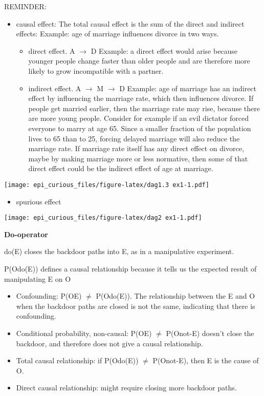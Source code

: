 \documentclass[
]{article}
\providecommand{\tightlist}{%
  \setlength{\itemsep}{0pt}\setlength{\parskip}{0pt}}
\begin{document}
REMINDER:

\begin{itemize}
\item
  causal effect: The total causal effect is the sum of the direct and
  indirect effects: Example: age of marriage influences divorce in two
  ways.

  \begin{itemize}
  \item
    direct effect. A \(\to\) D Example: a direct effect would arise
    because younger people change faster than older people and are
    therefore more likely to grow incompatible with a partner.
  \item
    indirect effect. A \(\to\) M \(\to\) D Example: age of marriage has
    an indirect effect by influencing the marriage rate, which then
    influences divorce. If people get married earlier, then the marriage
    rate may rise, because there are more young people. Consider for
    example if an evil dictator forced everyone to marry at age 65.
    Since a smaller fraction of the population lives to 65 than to 25,
    forcing delayed marriage will also reduce the marriage rate. If
    marriage rate itself has any direct effect on divorce, maybe by
    making marriage more or less normative, then some of that direct
    effect could be the indirect effect of age at marriage.
  \end{itemize}
\end{itemize}

\texttt{[image: epi\_curious\_files/figure-latex/dag1.3 ex1-1.pdf]}

\begin{itemize}
\tightlist
\item
  spurious effect
\end{itemize}

\texttt{[image: epi\_curious\_files/figure-latex/dag2 ex1-1.pdf]}

\textbf{Do-operator}

do(E) closes the backdoor paths into E, as in a manipulative experiment.

P(O\textbar do(E)) defines a causal relationship because it tells us the
expected result of manipulating E on O

\begin{itemize}
\item
  Confounding: P(O\textbar E) \(\ne\) P(O\textbar do(E)). The
  relationship between the E and O when the backdoor paths are closed is
  not the same, indicating that there is confounding.
\item
  Conditional probability, non-causal: P(O\textbar E) \(\ne\)
  P(O\textbar not-E) doesn't close the backdoor, and therefore does not
  give a causal relationship.
\item
  Total causal relationship: if P(O\textbar do(E)) \(\ne\)
  P(O\textbar not-E), then E is the cause of O.
\item
  Direct causal relationship: might require closing more backdoor paths.
\end{itemize}
\end{document}
